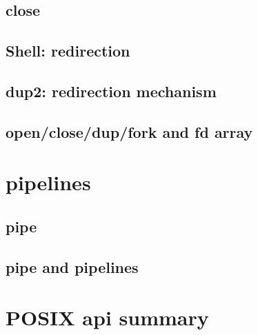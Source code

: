 

\subsection{close}



\subsection{Shell: redirection}



\subsection{dup2: redirection mechanism}



\subsection{open/close/dup/fork and fd array}


\section{pipelines}

\subsection{pipe}



\subsection{pipe and pipelines}



\section{POSIX api summary}

